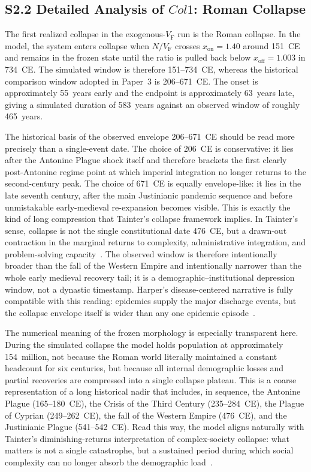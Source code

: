 \documentclass[11pt]{article}
\newcommand{\VF}{V_{\mathrm{F}}}
\newcommand{\xon}{x_{\mathrm{on}}}
\newcommand{\xoff}{x_{\mathrm{off}}}
\newcommand{\ColOne}{Col1}
\begin{document}
\subsection*{S2.2 Detailed Analysis of \texorpdfstring{$\ColOne$}{Col1}: Roman Collapse}

The first realized collapse in the exogenous-$\VF$ run is the Roman collapse. In the model, the system enters collapse when $N/\VF$ crosses $\xon=1.40$ around 151~CE and remains in the frozen state until the ratio is pulled back below $\xoff=1.003$ in 734~CE. The simulated window is therefore 151--734~CE, whereas the historical comparison window adopted in Paper~3 is 206--671~CE. The onset is approximately 55~years early and the endpoint is approximately 63~years late, giving a simulated duration of 583~years against an observed window of roughly 465~years.

The historical basis of the observed envelope 206--671~CE should be read more precisely than a single-event date. The choice of 206~CE is conservative: it lies after the Antonine Plague shock itself and therefore brackets the first clearly post-Antonine regime point at which imperial integration no longer returns to the second-century peak. The choice of 671~CE is equally envelope-like: it lies in the late seventh century, after the main Justinianic pandemic sequence and before unmistakable early-medieval re-expansion becomes visible. This is exactly the kind of long compression that Tainter's collapse framework implies. In Tainter's sense, collapse is not the single constitutional date 476~CE, but a drawn-out contraction in the marginal returns to complexity, administrative integration, and problem-solving capacity~\cite{tainter1988}. The observed window is therefore intentionally broader than the fall of the Western Empire and intentionally narrower than the whole early medieval recovery tail; it is a demographic--institutional depression window, not a dynastic timestamp. Harper's disease-centered narrative is fully compatible with this reading: epidemics supply the major discharge events, but the collapse envelope itself is wider than any one epidemic episode~\cite{harper2017}.

The numerical meaning of the frozen morphology is especially transparent here. During the simulated collapse the model holds population at approximately 154~million, not because the Roman world literally maintained a constant headcount for six centuries, but because all internal demographic losses and partial recoveries are compressed into a single collapse plateau. This is a coarse representation of a long historical nadir that includes, in sequence, the Antonine Plague (165--180~CE), the Crisis of the Third Century (235--284~CE), the Plague of Cyprian (249--262~CE), the fall of the Western Empire (476~CE), and the Justinianic Plague (541--542~CE). Read this way, the model aligns naturally with Tainter's diminishing-returns interpretation of complex-society collapse: what matters is not a single catastrophe, but a sustained period during which social complexity can no longer absorb the demographic load~\cite{tainter1988,harper2017}.
\end{document}
